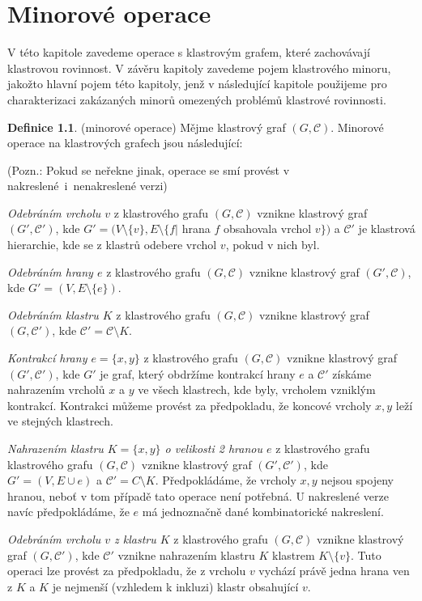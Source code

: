 \documentclass[12pt,a4report]{report}
\theoremstyle{definition}
\newtheorem{defn}[theorem]{Definice}
\begin{document}
\author{Filip Šedivý}

\chapter{Minorové operace}

V této kapitole zavedeme operace s klastrovým grafem, které zachovávají klastrovou rovinnost. V závěru kapitoly zavedeme pojem klastrového minoru, jakožto hlavní pojem této kapitoly, jenž v následující kapitole použijeme pro charakterizaci zakázaných minorů omezených problémů klastrové rovinnosti.

\begin{defn} (minorové operace) Mějme klastrový graf $(G, \mathcal C)$. Minorové operace na klastrových grafech jsou následující:

(Pozn.: Pokud se neřekne jinak, operace se smí provést v nakreslené~i~nenakreslené verzi)

\textit{Odebráním vrcholu $v$} z klastrového grafu $(G, \mathcal C)$ vznikne klastrový graf  $(G', \mathcal C')$, kde  $G' = (V \setminus \{v\}, E \setminus \{f |$ hrana $f$ obsahovala vrchol $v\})$ a $\mathcal C'$ je klastrová hierarchie, kde se z klastrů odebere vrchol $v$, pokud v nich byl.

\textit{Odebráním hrany $e$} z klastrového grafu $(G, \mathcal C)$ vznikne klastrový graf  $(G', \mathcal C)$, kde $G' =  (V,E \setminus \{e\})$.

\textit{Odebráním klastru $K$} z klastrového grafu $(G, \mathcal C)$ vznikne klastrový graf  $(G, \mathcal C')$, kde $\mathcal C' = \mathcal C \setminus K$.

\textit{Kontrakcí hrany $e=\{x,y\}$} z klastrového grafu $(G, \mathcal C)$ vznikne klastrový graf  $(G', \mathcal C')$, kde $G'$ je graf, který obdržíme kontrakcí hrany $e$ a $\mathcal C'$ získáme nahrazením vrcholů $x$ a $y$ ve všech klastrech, kde byly, vrcholem vzniklým kontrakcí. Kontrakci můžeme provést za předpokladu, že koncové vrcholy $x, y$ leží ve stejných klastrech.

\textit{Nahrazením klastru $K=\{x,y\}$ o velikosti 2 hranou $e$} z klastrového grafu klastrového grafu $(G, \mathcal C)$ vznikne klastrový graf  $(G', \mathcal C')$, kde $G'=(V,E \cup e)$ a $\mathcal C'= C \setminus K$. Předpokládáme, že vrcholy $x, y$ nejsou spojeny hranou, neboť v tom případě tato operace není potřebná. U nakreslené verze navíc předpokládáme, že $e$ má jednoznačně dané kombinatorické nakreslení.

\textit{Odebráním vrcholu $v$ z klastru $K$} z klastrového grafu $(G, \mathcal C)$ vznikne klastrový graf  $(G, \mathcal C')$, kde $\mathcal C'$ vznikne nahrazením klastru $K$ klastrem $K \setminus \{v\}$. Tuto operaci lze provést za předpokladu, že z vrcholu $v$ vychází právě jedna hrana ven z $K$ a $K$ je nejmenší (vzhledem k inkluzi) klastr obsahující $v$.


\end{defn}
\end{document}
